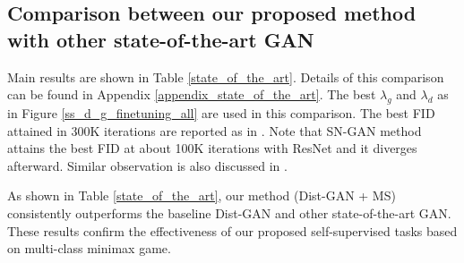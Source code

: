 \documentclass{article}
\begin{document}
\subsection{Comparison between our proposed method with other state-of-the-art GAN}

Main results are shown in Table \ref{state_of_the_art}. Details of this comparison can be found in Appendix \ref{appendix_state_of_the_art}. The best  $\lambda_g$ and $\lambda_d$ as in Figure \ref{ss_d_g_finetuning_all} are used in this comparison.
The best FID attained in 300K iterations are reported as in \cite{xiang-arxiv-2017, li-nips-2017, tran-eccv-2018, yazici-arxiv-2018}.
Note that SN-GAN method \cite{miyato-iclr-2018} attains the best FID at about 100K iterations with ResNet and it diverges afterward. Similar observation is also discussed in \cite{chen-arxiv-2018}. 

As shown in Table \ref{state_of_the_art}, our method (Dist-GAN + MS) consistently outperforms the baseline Dist-GAN and other state-of-the-art GAN. These results confirm the effectiveness of our proposed self-supervised tasks based on multi-class minimax game.
\end{document}
